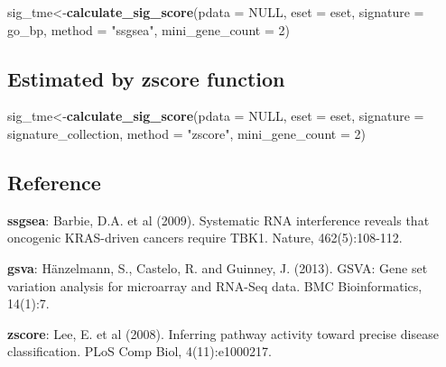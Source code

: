\documentclass[
  12pt,
]{book}
\newenvironment{Shaded}{\begin{snugshade}}{\end{snugshade}}
\newcommand{\AttributeTok}[1]{\textcolor[rgb]{0.13,0.29,0.53}{#1}}
\newcommand{\ConstantTok}[1]{\textcolor[rgb]{0.56,0.35,0.01}{#1}}
\newcommand{\DecValTok}[1]{\textcolor[rgb]{0.00,0.00,0.81}{#1}}
\newcommand{\FunctionTok}[1]{\textcolor[rgb]{0.13,0.29,0.53}{\textbf{#1}}}
\newcommand{\NormalTok}[1]{#1}
\newcommand{\OtherTok}[1]{\textcolor[rgb]{0.56,0.35,0.01}{#1}}
\newcommand{\StringTok}[1]{\textcolor[rgb]{0.31,0.60,0.02}{#1}}
\theoremstyle{definition}
\theoremstyle{definition}
\theoremstyle{definition}
\theoremstyle{definition}
\theoremstyle{remark}
\begin{document}
\begin{Shaded}
\begin{Highlighting}[]
\NormalTok{sig\_tme}\OtherTok{\textless{}{-}}\FunctionTok{calculate\_sig\_score}\NormalTok{(}\AttributeTok{pdata           =} \ConstantTok{NULL}\NormalTok{,}
                             \AttributeTok{eset            =}\NormalTok{ eset,}
                             \AttributeTok{signature       =}\NormalTok{ go\_bp,}
                             \AttributeTok{method          =} \StringTok{"ssgsea"}\NormalTok{,}
                             \AttributeTok{mini\_gene\_count =} \DecValTok{2}\NormalTok{)}
\end{Highlighting}
\end{Shaded}

\hypertarget{estimated-by-zscore-function}{%
\subsection{Estimated by zscore function}\label{estimated-by-zscore-function}}

\begin{Shaded}
\begin{Highlighting}[]
\NormalTok{sig\_tme}\OtherTok{\textless{}{-}}\FunctionTok{calculate\_sig\_score}\NormalTok{(}\AttributeTok{pdata           =} \ConstantTok{NULL}\NormalTok{,}
                             \AttributeTok{eset            =}\NormalTok{ eset,}
                             \AttributeTok{signature       =}\NormalTok{ signature\_collection,}
                             \AttributeTok{method          =} \StringTok{"zscore"}\NormalTok{,}
                             \AttributeTok{mini\_gene\_count =} \DecValTok{2}\NormalTok{)}
\end{Highlighting}
\end{Shaded}

\hypertarget{reference}{%
\subsection{Reference}\label{reference}}

\textbf{ssgsea}: Barbie, D.A. et al (2009). Systematic RNA interference reveals that oncogenic KRAS-driven cancers require TBK1. Nature, 462(5):108-112.

\textbf{gsva}: Hänzelmann, S., Castelo, R. and Guinney, J. (2013). GSVA: Gene set variation analysis for microarray and RNA-Seq data. BMC Bioinformatics, 14(1):7.

\textbf{zscore}: Lee, E. et al (2008). Inferring pathway activity toward precise disease classification. PLoS Comp Biol, 4(11):e1000217.
\end{document}
